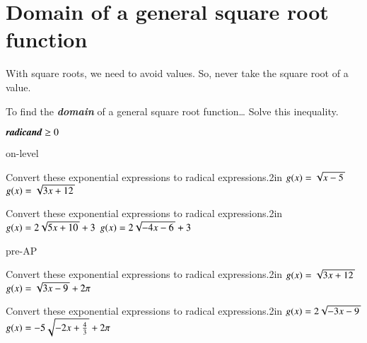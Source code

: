 \newpage
\section{Domain of a general square root function}

With square roots, we need to avoid  values. 
So, never take the square root of a  value.

\begin{myConcept}{To find the {\bfseries\itshape domain} of a general square root function\dots}
    Solve this inequality.
    \begin{myCenteredBox}[width=2in]
        \centering\LARGE 
        $ \text{\itshape\bfseries radicand} \geq 0 $ 
    \end{myCenteredBox}
\end{myConcept}




\begin{taggedblock}{on-level}
    \begin{myProblems2}{Convert these exponential expressions to radical expressions.}{2in}
        {
            $ g(x) = \myRoot{x - 5}$ 
        }
        {
            $ g(x) = \myRoot{3x + 12}$ 
        }
    \end{myProblems2}
    \begin{myProblems2}{Convert these exponential expressions to radical expressions.}{2in}
        {
            $ g(x) = 2\myRoot{5x + 10} + 3$ 
        }
        {
            $ g(x) = 2\myRoot{-4x - 6} + 3$ 
        }
    \end{myProblems2}
\end{taggedblock}


\begin{taggedblock}{pre-AP}
    \begin{myProblems2}{Convert these exponential expressions to radical expressions.}{2in}
        {
            $ g(x) = \myRoot{3x + 12}$ 
        }
        {
            $ g(x) = \myRoot{3x - 9} + 2\pi$ 
        }
    \end{myProblems2}
    \begin{myProblems2}{Convert these exponential expressions to radical expressions.}{2in}
        {
            $ g(x) = 2\myRoot{-3x - 9}$ 
        }
        {
            $ g(x) = -5\myRoot{-2x + \frac{4}{3}} + 2\pi$ 
        }
    \end{myProblems2}
\end{taggedblock}
